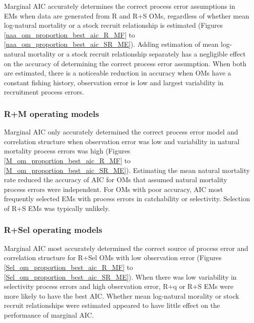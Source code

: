 \documentclass[
  12pt,
]{article}
\begin{document}
Marginal AIC accurately determines the correct process error assumptions
in EMs when data are generated from R and R+S OMs, regardless of whether
mean log-natural mortality or a stock recruit relationship is estimated
(Figures \ref{naa_om_proportion_best_aic_R_MF} to
\ref{naa_om_proportion_best_aic_SR_ME}). Adding estimation of mean
log-natural mortality or a stock recruit relationship separately has a
negligible effect on the accuracy of determining the correct process
error assumption. When both are estimated, there is a noticeable
reduction in accuracy when OMs have a constant fishing history,
observation error is low and largest variability in recruitment process
errors.

\hypertarget{rm-operating-models-1}{%
\subsubsection*{R+M operating models}\label{rm-operating-models-1}}

Marginal AIC only accurately determined the correct process error model
and correlation structure when observation error was low and variability
in natural mortality process errors was high (Figures
\ref{M_om_proportion_best_aic_R_MF} to
\ref{M_om_proportion_best_aic_SR_ME}). Estimating the mean natural
mortality rate reduced the accuracy of AIC for OMs that assumed natural
mortality process errors were independent. For OMs with poor accuracy,
AIC most frequently selected EMs with process errors in catchability or
selectivity. Selection of R+S EMs was typically unlikely.

\hypertarget{rsel-operating-models-1}{%
\subsubsection*{R+Sel operating models}\label{rsel-operating-models-1}}

Marginal AIC most accurately determined the correct source of process
error and correlation structure for R+Sel OMs with low observation error
(Figures \ref{Sel_om_proportion_best_aic_R_MF} to
\ref{Sel_om_proportion_best_aic_SR_ME}). When there was low variability
in selectivity process errors and high observation error, R+q or R+S EMs
were more likely to have the best AIC. Whether mean log-natural morality
or stock recruit relationships were estimated appeared to have little
effect on the performance of marginal AIC.
\end{document}
